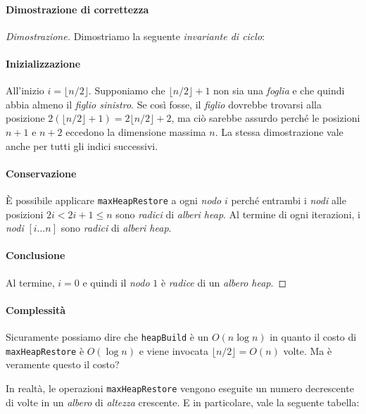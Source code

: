 \paragraph{Dimostrazione di correttezza}
\begin{proof}[Dimostrazione]
    Dimostriamo la seguente \emph{invariante di ciclo}:
    
    \smallskip{}
    \paragraph{Inizializzazione}
    All'inizio $i=\lfloor n/2\rfloor$. Supponiamo che $\lfloor n/2\rfloor+1$ non
    sia una \emph{foglia} e che quindi abbia almeno il \emph{figlio sinistro}.
    Se così fosse, il \emph{figlio} dovrebbe trovarsi alla posizione $2(\lfloor
    n/2\rfloor+1)=2\lfloor n/2\rfloor+2$, ma ciò sarebbe assurdo perché le posizioni
    $n+1$ e $n+2$ eccedono la dimensione massima $n$. La stessa dimostrazione
    vale anche per tutti gli indici successivi.
    \paragraph{Conservazione}
    È possibile applicare \texttt{maxHeapRestore} a ogni \emph{nodo} $i$ perché
    entrambi i \emph{nodi} alle posizioni $2i<2i+1\leq n$ sono \emph{radici}
    di \emph{alberi heap}. Al termine di ogni iterazioni, i \emph{nodi}
    $[i\dots n]$ sono \emph{radici} di \emph{alberi heap}.
    \paragraph{Conclusione} Al termine, $i=0$ e quindi il \emph{nodo} $1$ è
    \emph{radice} di un \emph{albero heap}.
\end{proof}
\paragraph{Complessità}
Sicuramente possiamo dire che \texttt{heapBuild} è un $O(n\log n)$ in quanto il costo
di \texttt{maxHeapRestore} è $O(\log n)$ e viene invocata $\lfloor n/2\rfloor=O(n)$
volte. Ma è veramente questo il costo?

\bigskip\noindent
In realtà, le operazioni \texttt{maxHeapRestore} vengono eseguite un
numero decrescente di volte in un \emph{albero} di \emph{altezza} crescente. E in
particolare, vale la seguente tabella:


